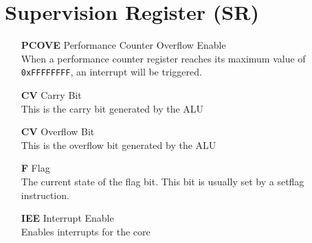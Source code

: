 \section{Supervision Register (SR)}


\begin{itemize}
  \item[\textbf{PCOVE}] Performance Counter Overflow Enable \\
    When a performance counter register reaches its maximum value of
    \texttt{0xFFFFFFFF}, an interrupt will be triggered.

  \item[\textbf{CV}] Carry Bit\\
    This is the carry bit generated by the ALU

  \item[\textbf{CV}] Overflow Bit\\
    This is the overflow bit generated by the ALU

  \item[\textbf{F}] Flag \\
    The current state of the flag bit. This bit is usually set by a setflag
    instruction.

  \item[\textbf{IEE}] Interrupt Enable\\
    Enables interrupts for the core
\end{itemize}
